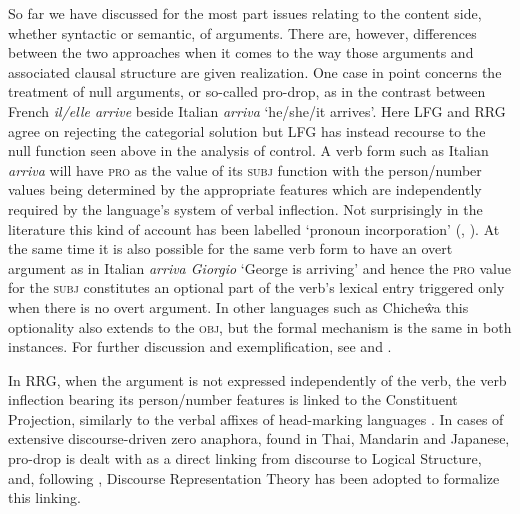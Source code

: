 \documentclass[output=paper,hidelinks]{langscibook}
\begin{document}
So far we have discussed for the most part issues relating to the content side, whether syntactic or semantic, of arguments. There are, however, differences between the two approaches when it comes to the way those arguments and associated clausal structure are given realization. One case in point concerns the treatment of null arguments, or so-called pro-drop, as in the contrast between French \textit{il/elle arrive} beside Italian \textit{arriva} `he/she/it arrives'. Here LFG and RRG agree on rejecting the categorial solution but LFG has instead recourse to the null function seen above in the analysis of control. A verb form such as Italian \textit{arriva} will have \textsc{pro} as the value of its \textsc{subj} function with the person/number values being determined by the appropriate features which are independently required by the language's system of verbal inflection. Not surprisingly in the literature this kind of account has been labelled `pronoun incorporation' (\citealt[68-75]{BoNoSa19}, ). At the same time it is also possible for the same verb form to have an overt argument as in Italian \textit{arriva Giorgio} `George is arriving' and hence the \textsc{pro} value for the \textsc{subj} constitutes an optional part of the verb's lexical entry triggered only when there is no overt argument. In other languages such as Chiche\^wa this optionality also extends to the \textsc{obj}, but the formal mechanism is the same in both instances. For further discussion and exemplification, see \citet[179-85, 500-502]{DLM:LFG} and \citet[Chapter~8]{BresnanEtAl2016}.

  In RRG, when the argument is not expressed independently of the verb, the verb inflection bearing its person/number features is linked to the Constituent Projection, similarly to the verbal affixes of head-marking languages \citep[331-332]{VanValin1997}. In cases of extensive discourse-driven zero anaphora, found in Thai, Mandarin and Japanese, pro-drop is dealt with as a direct linking from discourse to Logical Structure, and, following \citet[171-174]{VanValin2005},  Discourse Representation Theory has been adopted to formalize this linking.
\end{document}
